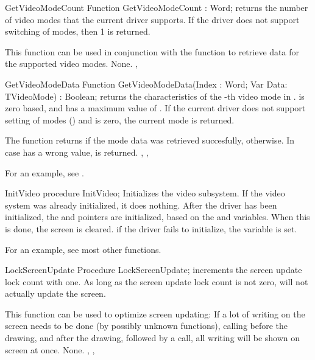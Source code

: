 
\begin{function}{GetVideoModeCount}
\Declaration
Function GetVideoModeCount : Word;
\Description
{} returns the number of video modes that the current
driver supports. If the driver does not support switching of modes, then 1
is returned.

This function can be used in conjunction with the 
function to retrieve data for the supported video modes.
\Errors
None.
\SeeAlso
{}, 
\end{function}


\begin{function}{GetVideoModeData}
\Declaration
Function GetVideoModeData(Index : Word; Var Data: TVideoMode) : Boolean;  
\Description
{} returns the characteristics of the -th
video mode in .  is zero based, and has a maximum value of
. If the current driver does not support setting of
modes () and  is zero, the current mode 
is returned.

The function returns  if the mode data was retrieved succesfully,
 otherwise.
\Errors
In case  has a wrong value,  is returned.
\SeeAlso
{}, , 
\end{function}

For an example, see .

\begin{procedure}{InitVideo}
\Declaration
procedure InitVideo; 
\Description
{} Initializes the video subsystem. If the video system was
already initialized, it does nothing. 
After the driver has been initialized, the  and  
pointers are initialized, based on the  and
 variables. When this is done, the screen is cleared.
\Errors
if the driver fails to initialize, the  variable is set.
\SeeAlso
{}
\end{procedure}

For an example, see most other functions.

\begin{procedure}{LockScreenUpdate}
\Declaration
Procedure LockScreenUpdate;
\Description
{} increments the screen update lock count with one.
As long as the screen update lock count is not zero, 
will not actually update the screen.

This function can be used to optimize screen updating: If a lot of writing
on the screen needs to be done (by possibly unknown functions), calling
 before the drawing, and 
after the drawing, followed by a  call, all writing will
be shown on screen at once.
\Errors
None.
\SeeAlso
{}, , 
\end{procedure}

